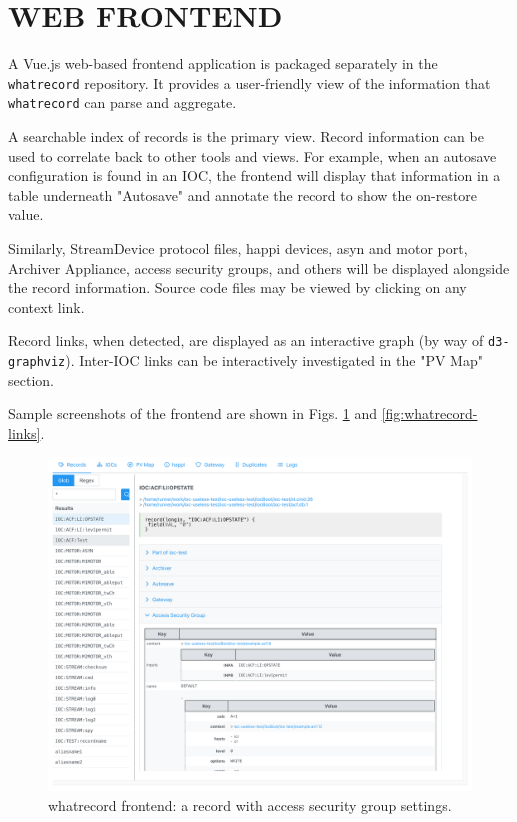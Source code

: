 \documentclass[letter,
               keeplastbox,   %
               ]{jacow}
\begin{document}
\section{WEB FRONTEND}

A Vue.js\cite{vuejs} web-based frontend application is packaged separately in
the \verb_whatrecord_ repository.  It provides a user-friendly view of the information
that \verb_whatrecord_ can parse and aggregate.

A searchable index of records is the primary view.  Record information can be
used to correlate back to other tools and views. For example, when an autosave
configuration is found in an IOC, the frontend will display that information in
a table underneath "Autosave" and annotate the record to show the on-restore
value.

Similarly, StreamDevice protocol files, happi devices, asyn and motor port,
Archiver Appliance, access security groups, and others will be displayed
alongside the record information.  Source code files may be viewed by
clicking on any context link.

Record links, when detected, are displayed as an interactive graph (by way of
\verb_d3-graphviz_\cite{d3graphviz}).  Inter-IOC links can be interactively
investigated in the "PV Map" section.

Sample screenshots of the frontend are shown in Figs. \ref{fig:whatrecord-asg}
and \ref{fig:whatrecord-links}.

\begin{figure}
   \centering
   \includegraphics*[width=.9\columnwidth]{whatrecord-asg}
   \caption{whatrecord frontend: a record with access security group settings.}
   \label{fig:whatrecord-asg}
\end{figure}
\end{document}
